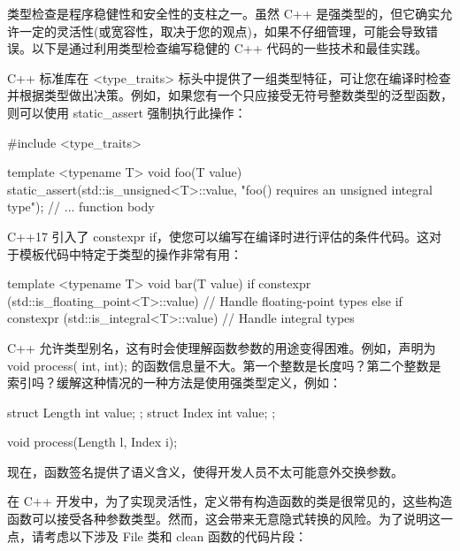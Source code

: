 


类型检查是程序稳健性和安全性的支柱之一。虽然 C++ 是强类型的，但它确实允许一定的灵活性(或宽容性，取决于您的观点)，如果不仔细管理，可能会导致错误。以下是通过利用类型检查编写稳健的 C++ 代码的一些技术和最佳实践。


C++ 标准库在 <type\_traits> 标头中提供了一组类型特征，可让您在编译时检查并根据类型做出决策。例如，如果您有一个只应接受无符号整数类型的泛型函数，则可以使用 static\_assert 强制执行此操作：

\begin{cpp}
#include <type_traits>

template <typename T>
void foo(T value) {
    static_assert(std::is_unsigned<T>::value, "foo() requires an unsigned integral type");
    // ... function body
}
\end{cpp}


C++17 引入了 constexpr if，使您可以编写在编译时进行评估的条件代码。这对于模板代码中特定于类型的操作非常有用：

\begin{cpp}
template <typename T>
void bar(T value) {
    if constexpr (std::is_floating_point<T>::value) {
        // Handle floating-point types
    } else if constexpr (std::is_integral<T>::value) {
        // Handle integral types
    }
}
\end{cpp}


C++ 允许类型别名，这有时会使理解函数参数的用途变得困难。例如，声明为 void process( int, int); 的函数信息量不大。第一个整数是长度吗？第二个整数是索引吗？缓解这种情况的一种方法是使用强类型定义，例如：

\begin{cpp}
struct Length { int value; };
struct Index { int value; };

void process(Length l, Index i);
\end{cpp}

现在，函数签名提供了语义含义，使得开发人员不太可能意外交换参数。



在 C++ 开发中，为了实现灵活性，定义带有构造函数的类是很常见的，这些构造函数可以接受各种参数类型。然而，这会带来无意隐式转换的风险。为了说明这一点，请考虑以下涉及 File 类和 clean 函数的代码片段：

